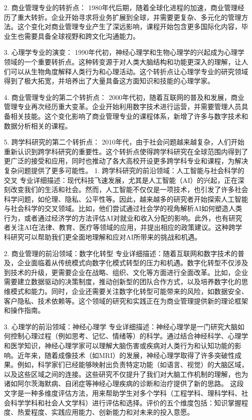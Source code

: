 \documentclass{extarticle}
\begin{document}
\begin{CJK*}{UTF8}{gbsn}
2. 商业管理专业的转折点：
1980年代后期，随着全球化进程的加速，商业管理经历了重大转折。企业开始寻求将业务扩展到全球，并需要更复杂、多元化的管理方法。这个变化对商业管理专业产生了深远影响，课程开始包含更多国际化内容，毕业生也需要具备全球视野和跨文化沟通能力。

3. 心理学专业的演变：
1990年代初，神经心理学和生物心理学的兴起成为心理学领域的一个重要转折点。这种转变源于对人类大脑结构和功能更深入的理解，让人们可以从生物角度解释人类行为和心理活动。这个转折点让心理学专业的研究领域得到了极大拓宽，并培养出了大量具备这方面知识和技能的心理学家。

4. 商业管理专业的第二个转折点：
2000年代初，随着互联网的普及和发展，商业管理专业再次经历重大变革。企业开始利用数字技术进行运营，并需要管理人员具备相关技能。这个变化影响了商业管理专业的课程体系，新增了许多与数字技术和数据分析相关的课程。

5. 跨学科研究的第二个转折点：
2010年代，由于社会问题越来越复杂，人们开始重新认识到跨学科研究的重要性。这个转折点使得跨学科研究在全球范围内得到了更广泛的接受和应用，同时也推动了各大高校开设更多跨学科专业和课程，为解决复杂问题提供了更多可能性。
1. 跨学科研究的前沿领域：人工智能与社会科学的交叉
    专业详细描述：现代科技飞速发展，尤其是人工智能（AI）的兴起，正在深刻改变我们的生活和社会。然而，人工智能不仅仅是一项技术，也引发了许多社会科学问题，如伦理、隐私、公平性等。因此，越来越多的研究者开始探索人工智能与社会科学的交叉领域。比如，他们尝试通过社会学的视角解析AI如何塑造人类行为，或者通过经济学的方法评估AI对就业和收入分配的影响。此外，也有研究者关注AI在法律、教育、医疗等领域的应用，并提出相应的政策建议。这种跨学科研究可以帮助我们更全面地理解和应对AI所带来的挑战和机遇。

2. 商业管理的前沿领域：数字化转型
    专业详细描述：随着互联网和数字技术的普及，企业面临着从传统模式向数字化模式转型的压力和机遇。数字化转型不仅涉及到技术的升级，更需要企业在战略、组织、文化等方面进行全面改革。比如，企业需要建立数据驱动的决策制度，推动创新型的团队合作方式，以及培养数字化的思维模式和能力。同时，企业还需要关注数字化转型可能带来的风险，如数据安全、客户隐私、技术依赖等。这个领域的研究和实践正在为商业管理提供新的理论框架和操作指南。

3. 心理学的前沿领域：神经心理学
    专业详细描述：神经心理学是一门研究大脑如何控制心理过程（例如思考、记忆、情绪等）的科学。通过结合神经科学、心理学和医学知识，神经心理学家可以理解大脑伤害或疾病对人类行为和认知功能的影响。近年来，随着成像技术（如MRI）的发展，神经心理学取得了许多突破性成果。例如，科学家们已经能够映射出负责特定功能（如语言、视觉）的大脑区域，以及这些区域之间的连接。这些研究不仅提升了我们对大脑工作机制的理解，也为诸如阿尔茨海默病、自闭症等神经心理疾病的诊断和治疗提供了新的思路。
这段文字是一种多维度评估方法，用来帮助学生对多个学科（工程学科、理科学科、社会科学学科和社会人文学科）进行评估和选择。评价的五个维度包括：知识掌握程度、热爱程度、实践应用能力、创新能力和对未来的投入意愿。


\end{CJK*}
\end{document}
